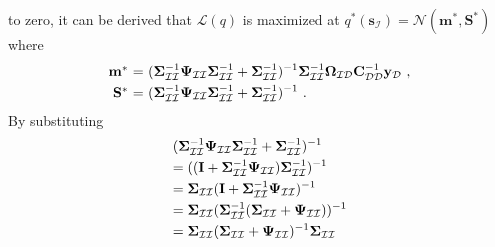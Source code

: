 \documentclass[conference]{IEEEtran}
\begin{document}
	to zero, it can be derived that $\mathcal{L}(q)$ is maximized at $q^*(\mathbf{s}_\mathcal{I})=\mathcal{N}(\mathbf{m}^*,\mathbf{S}^*)$ where
	\begin{equation}
		\begin{array}{rcl}
			\mathbf{m}^*&\hspace{-2.4mm}=&\hspace{-2.4mm}\displaystyle(\mathbf{\Sigma}_\mathcal{II}^{-1}\mathbf{\Psi}_\mathcal{II}\mathbf{\Sigma}_\mathcal{II}^{-1}+\mathbf{\Sigma}_\mathcal{II}^{-1})^{-1}\mathbf{\Sigma}_\mathcal{II}^{-1}\mathbf{\Omega}_\mathcal{ID}\mathbf{C}_\mathcal{DD}^{-1}\mathbf{y}_\mathcal{D}\ , \vspace{1mm} \\
			\mathbf{S}^*&\hspace{-2.4mm}=&\hspace{-2.4mm}\displaystyle(\mathbf{\Sigma}_\mathcal{II}^{-1}\mathbf{\Psi}_\mathcal{II}\mathbf{\Sigma}_\mathcal{II}^{-1}+\mathbf{\Sigma}_\mathcal{II}^{-1})^{-1}\ .
		\end{array}
		\label{happy}
	\end{equation}
	By substituting	
	\begin{equation*}
		\begin{array}{l}
			\displaystyle(\mathbf{\Sigma}_\mathcal{II}^{-1}\mathbf{\Psi}_\mathcal{II}\mathbf{\Sigma}_\mathcal{II}^{-1}+\mathbf{\Sigma}_\mathcal{II}^{-1})^{-1}\vspace{1mm}\\
			\displaystyle=((\mathbf{I}+\mathbf{\Sigma}_\mathcal{II}^{-1}\mathbf{\Psi}_\mathcal{II})\mathbf{\Sigma}_\mathcal{II}^{-1})^{-1}\vspace{1mm}\\
			\displaystyle=\mathbf{\Sigma}_\mathcal{II}(\mathbf{I}+\mathbf{\Sigma}_\mathcal{II}^{-1}\mathbf{\Psi}_\mathcal{II})^{-1}\vspace{1mm}\\
			\displaystyle=\mathbf{\Sigma}_\mathcal{II}(\mathbf{\Sigma}_\mathcal{II}^{-1}(\mathbf{\Sigma}_\mathcal{II}+\mathbf{\Psi}_\mathcal{II}))^{-1}\vspace{1mm}\\
			\displaystyle=\mathbf{\Sigma}_\mathcal{II}(\mathbf{\Sigma}_\mathcal{II}+\mathbf{\Psi}_\mathcal{II})^{-1}\mathbf{\Sigma}_\mathcal{II}
		\end{array}
	\end{equation*}
\end{document}
